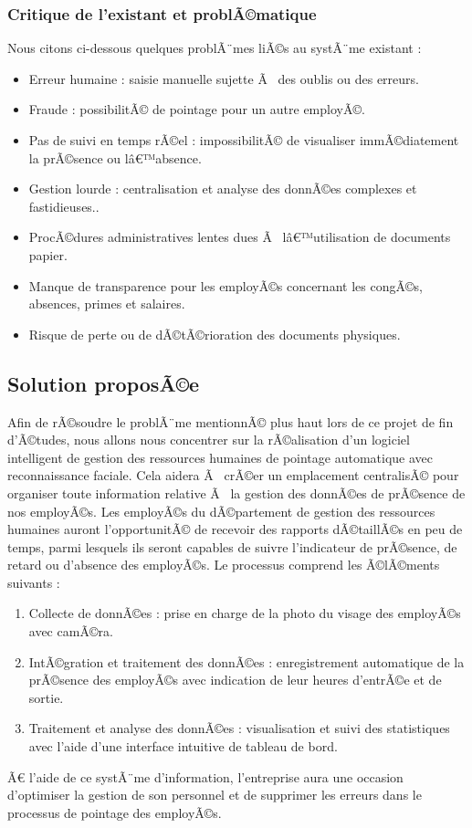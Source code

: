 \subsubsection{Critique de l'existant et problÃ©matique}
Nous citons ci-dessous quelques problÃ¨mes liÃ©s au systÃ¨me existant :
\begin{itemize}
 \item  Erreur humaine : saisie manuelle sujette Ã  des oublis ou des erreurs.

\item Fraude : possibilitÃ© de pointage pour un autre employÃ©.

\item Pas de suivi en temps rÃ©el : impossibilitÃ© de visualiser immÃ©diatement la prÃ©sence ou lâ€™absence.

\item Gestion lourde : centralisation et analyse des donnÃ©es complexes et fastidieuses..
\item ProcÃ©dures administratives lentes dues Ã  lâ€™utilisation de documents papier. 
\item Manque de transparence pour les employÃ©s concernant les congÃ©s, absences, primes et salaires. 
\item Risque de perte ou de dÃ©tÃ©rioration des documents physiques.
\end{itemize}

\subsection{Solution proposÃ©e}
Afin de rÃ©soudre le problÃ¨me mentionnÃ© plus haut lors de ce projet de fin d'Ã©tudes,
nous allons nous concentrer sur la rÃ©alisation d'un logiciel intelligent de gestion des ressources humaines de pointage automatique avec reconnaissance faciale.
Cela aidera Ã  crÃ©er un emplacement centralisÃ© pour organiser toute information relative Ã  la gestion des donnÃ©es de prÃ©sence de nos employÃ©s.
Les employÃ©s du dÃ©partement de gestion des ressources humaines auront l'opportunitÃ© de recevoir des rapports dÃ©taillÃ©s en peu de temps, parmi lesquels ils seront capables de suivre l'indicateur de prÃ©sence, de retard ou d'absence des employÃ©s.
Le processus comprend les Ã©lÃ©ments suivants :
\begin{enumerate}
    \item  Collecte de donnÃ©es : prise en charge de la photo du visage des employÃ©s avec camÃ©ra.
\item   IntÃ©gration et traitement des donnÃ©es : enregistrement automatique de la prÃ©sence des employÃ©s avec indication de leur heures d'entrÃ©e et de sortie.
\item  Traitement et analyse des donnÃ©es : visualisation et suivi des statistiques avec l'aide d'une interface intuitive de tableau de bord.
\end{enumerate}
Ã€ l'aide de ce systÃ¨me d'information, l'entreprise aura une occasion d'optimiser la gestion de son personnel et de supprimer les erreurs dans le processus de pointage des employÃ©s.

